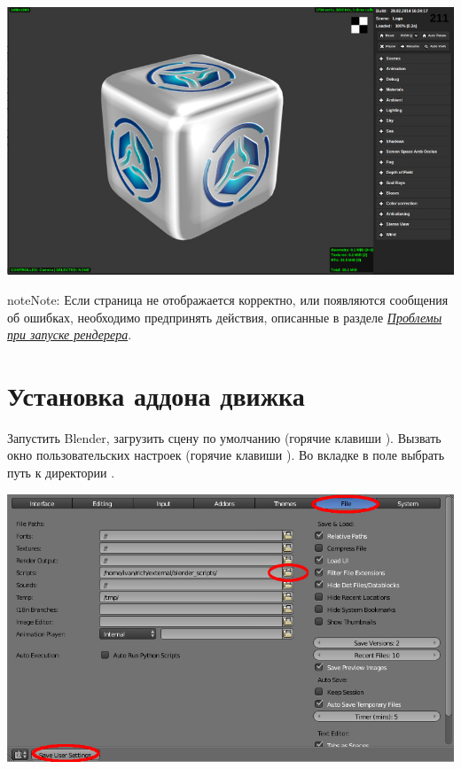 \documentclass[a4paper,12pt,oneside]{sphinxmanual}
\begin{document}
{\hfill\includegraphics[width=1.000\linewidth]{default_page.jpg}\hfill}

\begin{DUlineblock}{0em}
\item[] 
\end{DUlineblock}

\begin{notice}{note}{Note:}
Если страница не отображается корректно, или появляются сообщения об ошибках, необходимо предпринять действия, описанные в разделе {\hyperref[problems_and_solutions:renderer-not-working]{\emph{Проблемы при запуске рендерера}}}.
\end{notice}


\section{Установка аддона движка}
\label{setup:getting-started-addon}\label{setup:id5}\label{setup:index-3}
Запустить Blender, загрузить сцену по умолчанию  (горячие клавиши ).
Вызвать окно пользовательских настроек  (горячие клавиши ). Во вкладке   в поле   выбрать путь к директории .

{\hfill\includegraphics[width=1.000\linewidth]{user_preferences_scripts_path.jpg}\hfill}
\end{document}
